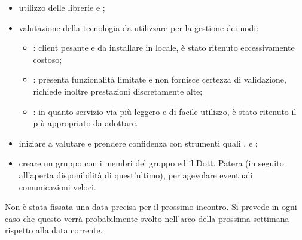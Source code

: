 
\begin{itemize}
    \item utilizzo delle librerie  e ;
    \item valutazione della tecnologia da utilizzare per la gestione dei nodi:
        \begin{itemize}
            \item {}: client pesante e da installare in locale, è stato ritenuto eccessivamente costoso;
            \item {}: presenta funzionalità limitate e non fornisce certezza di validazione, richiede inoltre prestazioni discretamente alte;
            \item {}: in quanto servizio via  più leggero e di facile utilizzo, è stato ritenuto il più appropriato da adottare.
        \end{itemize}
    \item iniziare a valutare e prendere confidenza con strumenti quali ,  e ;
    \item creare un gruppo  con i membri del gruppo ed il Dott. Patera (in seguito all'aperta disponibilità di quest'ultimo), per agevolare eventuali comunicazioni veloci.
\end{itemize}

Non è stata fissata una data precisa per il prossimo incontro. Si prevede in ogni caso che questo verrà probabilmente svolto nell'arco della prossima settimana rispetto alla data corrente.
